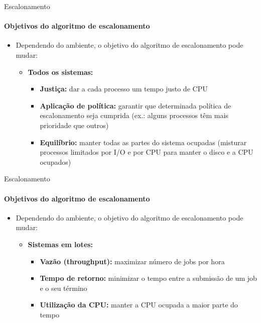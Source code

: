 \documentclass{beamer}
\begin{document}
\begin{frame}{Escalonamento}
	\framesubtitle{Objetivos do algoritmo de escalonamento}
	\begin{itemize}
		\item Dependendo do ambiente, o objetivo do algoritmo de escalonamento pode mudar:
		\begin{itemize}
			\item \textbf{Todos os sistemas:}
			\begin{itemize}
				\item \textbf{Justiça:} dar a cada processo um tempo justo de CPU
				\item \textbf{Aplicação de política:} garantir que determinada política de escalonamento seja cumprida (ex.: alguns processos têm mais prioridade que outros)
				\item \textbf{Equilíbrio:} manter todas as partes do sistema ocupadas (misturar processos limitados por I/O e por CPU para manter o disco e a CPU ocupados)
			\end{itemize}
		\end{itemize}
	\end{itemize}
\end{frame}
\begin{frame}{Escalonamento}
	\framesubtitle{Objetivos do algoritmo de escalonamento}
	\begin{itemize}
		\item Dependendo do ambiente, o objetivo do algoritmo de escalonamento pode mudar:
		\begin{itemize}
			\item \textbf{Sistemas em lotes:}
			\begin{itemize}
				\item \textbf{Vazão (throughput):} maximizar número de jobs por hora
				\item \textbf{Tempo de retorno:} minimizar o tempo entre a submissão de um job e o seu término
				\item \textbf{Utilização da CPU:} manter a CPU ocupada a maior parte do tempo
			\end{itemize}
		\end{itemize}
	\end{itemize}
\end{frame}
\end{document}
